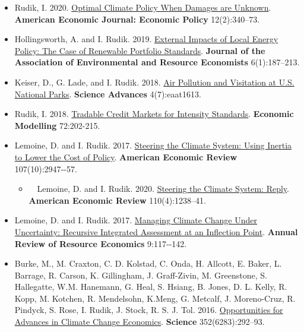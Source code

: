\documentclass[11pt]{res} %
\begin{document}
\begin{resume}
\begin{itemize}
	\item[] Rudik, I. 2020. \href{https://www.aeaweb.org/articles?id=10.1257/pol.20160541}{Optimal Climate Policy When Damages are Unknown}. \textbf{American Economic Journal: Economic Policy} 12(2):340--73.
	\item[] Hollingsworth, A. and I. Rudik. 2019. \href{http://papers.ssrn.com/sol3/papers.cfm?abstract_id=2697222}{External Impacts of Local Energy Policy: The Case of Renewable Portfolio Standards}. \textbf{Journal of the Association of Environmental and Resource Economists} 6(1):187--213.
	\item[] Keiser, D., G. Lade, and I. Rudik. 2018. \href{http://advances.sciencemag.org/content/4/7/eaat1613}{Air Pollution and Visitation at U.S. National Parks}. \textbf{Science Advances} 4(7):eaat1613.
	\item[] Rudik, I. 2018. \href{https://www.sciencedirect.com/science/article/pii/S0264999317315651}{Tradable Credit Markets for Intensity Standards}. \textbf{Economic Modelling} 72:202-215.
	\item[] Lemoine, D. and I. Rudik. 2017.  \href{http://papers.ssrn.com/sol3/papers.cfm?abstract_id=2443594}{Steering the Climate System: Using Inertia to Lower the Cost of Policy}. \textbf{American Economic Review} 107(10):2947‐-57.
	\begin{itemize}
		\item[] \,\,\,\, Lemoine, D. and I. Rudik. 2020.  \href{http://papers.ssrn.com/sol3/papers.cfm?abstract_id=2443594}{Steering the Climate System: Reply}. \textbf{American Economic Review} 110(4):1238--41.
	\end{itemize}
	\item[] Lemoine, D. and I. Rudik. 2017. \href{https://papers.ssrn.com/sol3/papers.cfm?abstract_id=2862211}{Managing Climate Change Under Uncertainty: Recursive Integrated Assessment at an Inflection Point}.  \textbf{Annual Review of Resource Economics} 9:117‐-142.
	\item[]  Burke, M., M. Craxton, C. D. Kolstad, C. Onda, H. Allcott, E. Baker, L. Barrage, R. Carson, K. Gillingham, J. Graff-Zivin, M. Greenstone, S. Hallegatte, W.M. Hanemann, G. Heal, S. Hsiang, B. Jones, D. L. Kelly, R. Kopp, M. Kotchen, R. Mendelsohn, K.Meng, G. Metcalf, J. Moreno-Cruz, R. Pindyck, S. Rose, I. Rudik, J. Stock, R. S. J. Tol. 2016. \href{http://science.sciencemag.org/content/352/6283/292.abstract}{Opportunities for Advances in Climate Change Economics}. \textbf{Science} 352(6283):292--93.
\end{itemize} 



\end{resume}
\end{document}
